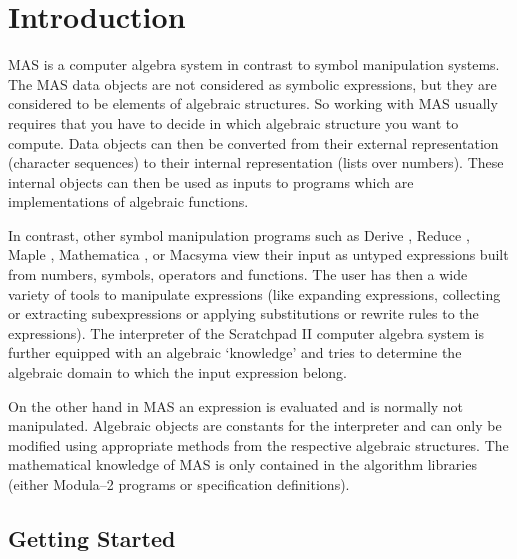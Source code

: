

\chapter{Introduction} %

MAS is a computer algebra system in contrast to 
symbol manipulation systems.
The MAS data objects are not considered as 
symbolic expressions, 
but they are considered to be elements of 
algebraic structures.
So working with MAS usually requires that you have to decide 
in which algebraic structure you want to compute. 
Data objects can then be converted from their external representation
(character sequences) to their internal representation 
(lists over numbers).
These internal objects can then be used as inputs to
programs which are implementations of algebraic functions.  

In contrast, other symbol manipulation programs such as  
Derive \cite{Rich 88},
Reduce \cite{Hearn 87},
Maple \cite{Geddes 86},
Mathematica \cite{Wolfram 88}, 
or Macsyma \cite{Pavelle 85}
view their input as untyped expressions built from
numbers, symbols, operators and functions.
The user has then a wide variety of tools to 
manipulate expressions 
(like expanding expressions, collecting or extracting subexpressions
or applying substitutions or rewrite rules to the expressions).
The interpreter of the
Scratchpad II \cite{Jenks 84,Jenks 85} 
computer algebra system is further
equipped with an algebraic `knowledge' 
and tries to determine the algebraic domain 
to which the input expression belong.

On the other hand in MAS an expression is evaluated 
and is normally not manipulated. 
Algebraic objects are constants for the interpreter and can
only be modified using appropriate methods from the 
respective algebraic structures. 
The mathematical knowledge 
of MAS is only contained in the 
algorithm libraries
(either Modula--2 programs or specification definitions).


\section{Getting Started} %

